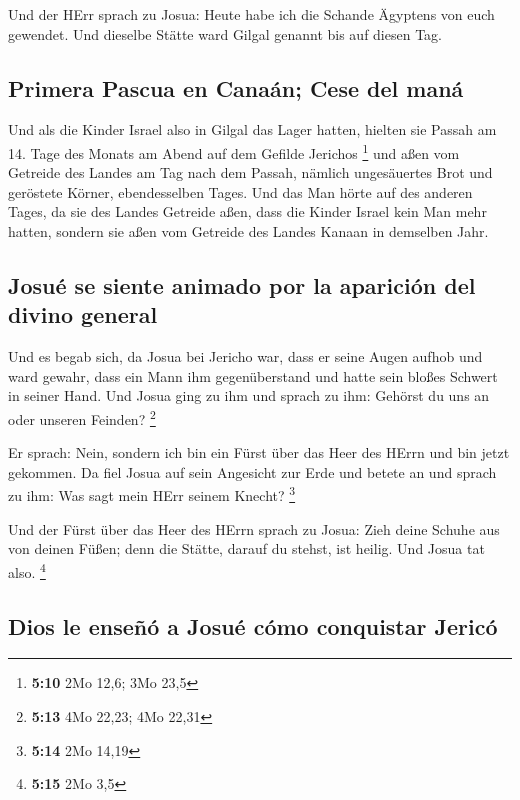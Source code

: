  Und der HErr sprach zu Josua: Heute habe ich die Schande
Ägyptens von euch gewendet. Und dieselbe Stätte ward Gilgal genannt bis
auf diesen Tag.

\hypertarget{primera-pascua-en-canauxe1n-cese-del-manuxe1}{%
\subsection{Primera Pascua en Canaán; Cese del
maná}\label{primera-pascua-en-canauxe1n-cese-del-manuxe1}}

 Und als die Kinder Israel also in Gilgal das Lager
hatten, hielten sie Passah am 14. Tage des Monats am Abend auf dem
Gefilde Jerichos \footnote{\textbf{5:10} 2Mo 12,6; 3Mo 23,5}
 und aßen vom Getreide des Landes am Tag nach dem Passah,
nämlich ungesäuertes Brot und geröstete Körner, ebendesselben Tages.
 Und das Man hörte auf des anderen Tages, da sie des
Landes Getreide aßen, dass die Kinder Israel kein Man mehr hatten,
sondern sie aßen vom Getreide des Landes Kanaan in demselben Jahr.

\hypertarget{josuuxe9-se-siente-animado-por-la-apariciuxf3n-del-divino-general}{%
\subsection{Josué se siente animado por la aparición del divino
general}\label{josuuxe9-se-siente-animado-por-la-apariciuxf3n-del-divino-general}}

 Und es begab sich, da Josua bei Jericho war, dass er
seine Augen aufhob und ward gewahr, dass ein Mann ihm gegenüberstand und
hatte sein bloßes Schwert in seiner Hand. Und Josua ging zu ihm und
sprach zu ihm: Gehörst du uns an oder unseren Feinden? \footnote{\textbf{5:13}
  4Mo 22,23; 4Mo 22,31}

 Er sprach: Nein, sondern ich bin ein Fürst über das Heer
des HErrn und bin jetzt gekommen. Da fiel Josua auf sein Angesicht zur
Erde und betete an und sprach zu ihm: Was sagt mein HErr seinem Knecht?
\footnote{\textbf{5:14} 2Mo 14,19}

 Und der Fürst über das Heer des HErrn sprach zu Josua:
Zieh deine Schuhe aus von deinen Füßen; denn die Stätte, darauf du
stehst, ist heilig. Und Josua tat also. \footnote{\textbf{5:15} 2Mo 3,5}

\hypertarget{dios-le-enseuxf1uxf3-a-josuuxe9-cuxf3mo-conquistar-jericuxf3}{%
\subsection{Dios le enseñó a Josué cómo conquistar
Jericó}\label{dios-le-enseuxf1uxf3-a-josuuxe9-cuxf3mo-conquistar-jericuxf3}}

